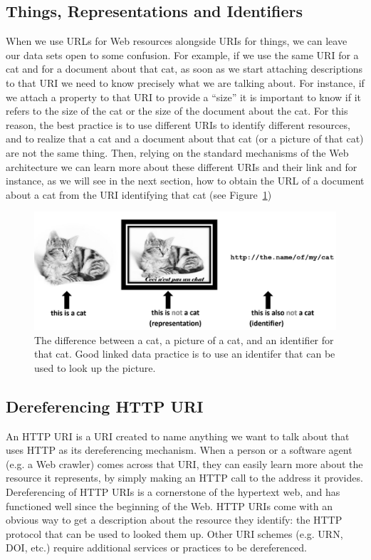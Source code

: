 \subsection{Things, Representations and Identifiers}
\label{usehttp}
When we use URLs for Web resources alongside URIs for things, we can
leave our data sets open to some confusion. For example, if we use the
same URI for a cat and for a document about that cat, as soon as we
start attaching descriptions to that URI we need to know precisely what
we are talking about. For instance, if we attach a property to that URI
to provide a ``size'' it is important to know if it refers to the size of the
cat or the size of the document about the cat. For this reason, the best
practice is to use different URIs to identify different resources, and
to realize that a cat and a document about that cat (or a picture of
that cat) are not the same thing. Then, relying on the standard
mechanisms of the Web architecture we can learn more about these
different URIs and their link and for instance, as we will see in the
next section, how to obtain the URL of a document about a cat from the
URI identifying that cat (see Figure~\ref{fig:ch5.cats})

\begin{figure}
    \centering
    \includegraphics[width=5in]{media/ch5/WebAndCats.jpg}
    \caption{The difference between a cat, a picture of a cat, and an identifier for that cat.  Good linked data practice is to use an identifer that can be used to look up the picture. }
    \label{fig:ch5.cats}
\end{figure}

\hypertarget{dereferencing-http-uri}{%
\subsection{Dereferencing HTTP URI }\label{dereferencing-http-uri}}

An HTTP URI is a URI created to name anything we want to talk about 
that  uses  HTTP   as its dereferencing mechanism. When a person or a
software agent (e.g. a Web crawler) comes across that URI, they can easily learn more
about the resource it represents,  by simply making an HTTP call
to the address it provides.   Dereferencing of HTTP URIs is a cornerstone of the hypertext web, and has
functioned well since the beginning of the Web. HTTP URIs come with an
obvious way to get a description about the resource they identify: the
HTTP protocol that can be used to looked them up. Other URI schemes
(e.g. URN, DOI, etc.) require additional services or practices to be
dereferenced.  

